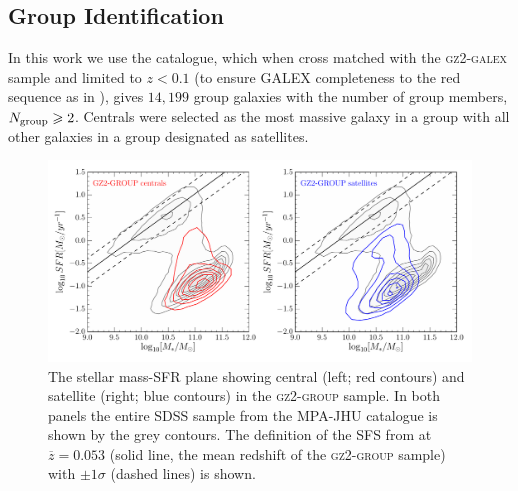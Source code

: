 \documentclass[useAMS,usenatbib]{mn2e}
\begin{document}
\subsection{Group Identification}\label{sec:groups}


In this work we use the \citet{berlind06} catalogue, which when cross matched with the \textsc{gz2-galex} sample and limited to $z < 0.1$ (to ensure GALEX completeness to the red sequence as in \citealt{wyder07, yesuf14}), gives $14,199$ group galaxies with the number of group members, $N_{\rm{group}} \geq 2$. Centrals were selected as the most massive galaxy in a group \citep[as in][]{yang07, yang09, pasquali10} with all other galaxies in a group designated as satellites.

\begin{figure}
\centering
\includegraphics[width=\textwidth]{sfr_mass_quenched_centrals_satellites_gz2_group.pdf}
\caption[Stellar mass-SFR plane for the centrals and satellites of the \textsc{gz2-group} sample]{The stellar mass-SFR plane showing central (left; red contours) and satellite (right; blue contours) in the \textsc{gz2-group} sample. In both panels the entire SDSS sample from the MPA-JHU catalogue is shown by the grey contours. The definition of the SFS from \cite{peng10} at $\overline{z} = 0.053$ (solid line, the mean redshift of the \textsc{gz2-group} sample) with $\pm1\sigma$ (dashed lines) is shown.}
\label{fig:sfrmass}
\end{figure}
\end{document}
